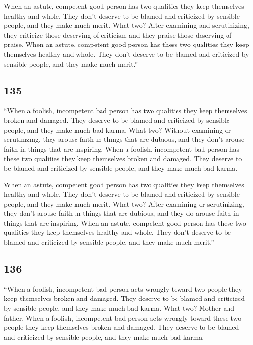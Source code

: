 \documentclass[12pt,openany]{book}%
\begin{document}
When an astute, competent good person has two qualities they keep themselves healthy and whole. They don’t deserve to be blamed and criticized by sensible people, and they make much merit. What two? After examining and scrutinizing, they criticize those deserving of criticism and they praise those deserving of praise. When an astute, competent good person has these two qualities they keep themselves healthy and whole. They don’t deserve to be blamed and criticized by sensible people, and they make much merit.” 

\subsection*{135 }

“When a foolish, incompetent bad person has two qualities they keep themselves broken and damaged. They deserve to be blamed and criticized by sensible people, and they make much bad karma. What two? Without examining or scrutinizing, they arouse faith in things that are dubious, and they don’t arouse faith in things that are inspiring. When a foolish, incompetent bad person has these two qualities they keep themselves broken and damaged. They deserve to be blamed and criticized by sensible people, and they make much bad karma. 

When an astute, competent good person has two qualities they keep themselves healthy and whole. They don’t deserve to be blamed and criticized by sensible people, and they make much merit. What two? After examining or scrutinizing, they don’t arouse faith in things that are dubious, and they do arouse faith in things that are inspiring. When an astute, competent good person has these two qualities they keep themselves healthy and whole. They don’t deserve to be blamed and criticized by sensible people, and they make much merit.” 

\subsection*{136 }

“When a foolish, incompetent bad person acts wrongly toward two people they keep themselves broken and damaged. They deserve to be blamed and criticized by sensible people, and they make much bad karma. What two? Mother and father. When a foolish, incompetent bad person acts wrongly toward these two people they keep themselves broken and damaged. They deserve to be blamed and criticized by sensible people, and they make much bad karma. 
\end{document}

